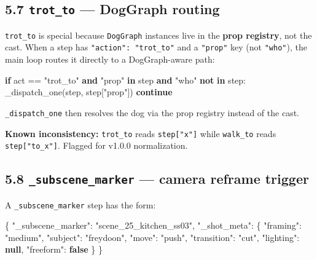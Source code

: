 \documentclass[
  11pt,
]{book}
\newenvironment{Shaded}{}{}
\newcommand{\ControlFlowTok}[1]{\textcolor[rgb]{0.00,0.44,0.13}{\textbf{#1}}}
\newcommand{\DataTypeTok}[1]{\textcolor[rgb]{0.56,0.13,0.00}{#1}}
\newcommand{\FunctionTok}[1]{\textcolor[rgb]{0.02,0.16,0.49}{#1}}
\newcommand{\KeywordTok}[1]{\textcolor[rgb]{0.00,0.44,0.13}{\textbf{#1}}}
\newcommand{\NormalTok}[1]{#1}
\newcommand{\OperatorTok}[1]{\textcolor[rgb]{0.40,0.40,0.40}{#1}}
\newcommand{\StringTok}[1]{\textcolor[rgb]{0.25,0.44,0.63}{#1}}
\begin{document}
\subsection{\texorpdfstring{5.7 \texttt{trot\_to} --- DogGraph
routing}{5.7 trot\_to --- DogGraph routing}}\label{trot_to-doggraph-routing}

\texttt{trot\_to} is special because \texttt{DogGraph} instances live in
the \textbf{prop registry}, not the cast. When a step has
\texttt{"action":\ "trot\_to"} and a \texttt{"prop"} key (not
\texttt{"who"}), the main loop routes it directly to a DogGraph-aware
path:

\begin{Shaded}
\begin{Highlighting}[]
\ControlFlowTok{if}\NormalTok{ act }\OperatorTok{==} \StringTok{"trot\_to"} \KeywordTok{and} \StringTok{"prop"} \KeywordTok{in}\NormalTok{ step }\KeywordTok{and} \StringTok{"who"} \KeywordTok{not} \KeywordTok{in}\NormalTok{ step:}
\NormalTok{    \_dispatch\_one(step, step[}\StringTok{"prop"}\NormalTok{])}
    \ControlFlowTok{continue}
\end{Highlighting}
\end{Shaded}

\texttt{\_dispatch\_one} then resolves the dog via the prop registry
instead of the cast.

\textbf{Known inconsistency:} \texttt{trot\_to} reads
\texttt{step{[}"x"{]}} while \texttt{walk\_to} reads
\texttt{step{[}"to\_x"{]}}. Flagged for v1.0.0 normalization.

\subsection{\texorpdfstring{5.8 \texttt{\_subscene\_marker} --- camera
reframe
trigger}{5.8 \_subscene\_marker --- camera reframe trigger}}\label{subscene_marker-camera-reframe-trigger}

A \texttt{\_subscene\_marker} step has the form:

\begin{Shaded}
\begin{Highlighting}[]
\FunctionTok{\{}
  \DataTypeTok{"\_subscene\_marker"}\FunctionTok{:} \StringTok{"scene\_25\_kitchen\_ss03"}\FunctionTok{,}
  \DataTypeTok{"\_shot\_meta"}\FunctionTok{:} \FunctionTok{\{}
    \DataTypeTok{"framing"}\FunctionTok{:}    \StringTok{"medium"}\FunctionTok{,}
    \DataTypeTok{"subject"}\FunctionTok{:}    \StringTok{"freydoon"}\FunctionTok{,}
    \DataTypeTok{"move"}\FunctionTok{:}       \StringTok{"push"}\FunctionTok{,}
    \DataTypeTok{"transition"}\FunctionTok{:} \StringTok{"cut"}\FunctionTok{,}
    \DataTypeTok{"lighting"}\FunctionTok{:}   \KeywordTok{null}\FunctionTok{,}
    \DataTypeTok{"freeform"}\FunctionTok{:}   \KeywordTok{false}
  \FunctionTok{\}}
\FunctionTok{\}}
\end{Highlighting}
\end{Shaded}
\end{document}

